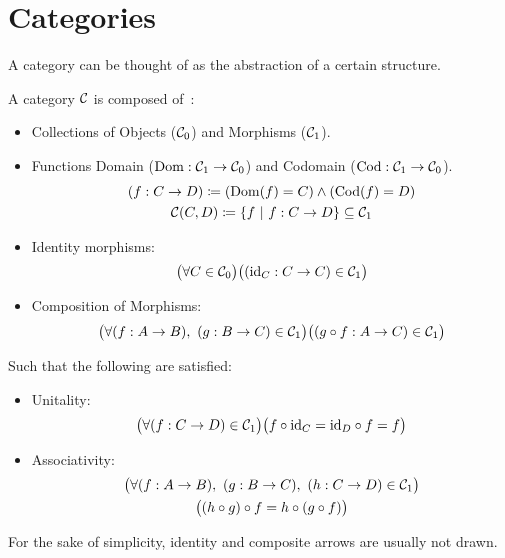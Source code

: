 \section{Categories}
A category can be thought of as the abstraction of a certain structure.

\begin{definition}[Category]
  A category $\mathcal{C}$ is composed of~\parencite[p.~4]{awodey:category_theory}:
  \begin{itemize}
    \item Collections of Objects ($\mathcal{C}_0$) and Morphisms ($\mathcal{C}_1$).
    \item Functions Domain ($\mathrm{Dom}:\mathcal{C}_1\to \mathcal{C}_0$) and Codomain
      ($\mathrm{Cod}: \mathcal{C}_1 \to \mathcal{C}_0$).
      \[
        \begin{gathered}
          (f : C\to D)
          \coloneqq (\mathrm{Dom}(f) = C) \land (\mathrm{Cod}(f) = D)\\
          \mathcal{C}(C, D) \coloneqq \{f\ |\ f : C \to D\}\subseteq \mathcal{C}_1
        \end{gathered}
      \]
    \item Identity morphisms:
      \[\big(\forall C \in \mathcal{C}_0\big)
        \big((\mathrm{id}_C : C\to C)\in \mathcal{C}_1\big)\]
    \item Composition of Morphisms:
      \[\big(\forall (f:A \to B),\ (g : B\to C) \in \mathcal{C}_1\big)
        \big((g\circ f:A\to C) \in \mathcal{C}_1\big)\]
  \end{itemize}

  Such that the following are satisfied:
  \begin{itemize}
    \item Unitality:
      \[\big(\forall (f:C\to D)\in \mathcal{C}_1\big)
        \big(f \circ \mathrm{id}_C = \mathrm{id}_D \circ f = f\big)\]
    \item Associativity:
      \[
        \begin{gathered}
          \big(\forall (f : A\to B),\ (g: B\to C),\ (h: C\to D)\in\mathcal{C}_1\big)\\
          \big((h \circ g) \circ f = h \circ (g \circ f)\big)
        \end{gathered}
      \]
  \end{itemize}
\end{definition}

\begin{remark}
  For the sake of simplicity, identity and composite arrows are usually not
  drawn.
\end{remark}

